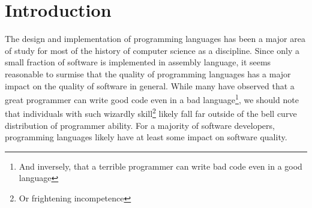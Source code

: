 %
%

\chapter{Introduction}\label{ch:intro} %

The design and implementation of programming languages has been a major area of study for most of the history of computer science as a discipline. Since only a small fraction of software is implemented in assembly language, it seems reasonable to surmise that the quality of programming languages has a major impact on the quality of software in general. While many have observed that a great programmer can write good code even in a bad language\footnote{And inversely, that a terrible programmer can write bad code even in a good language}, we should note that individuals with such wizardly skill\footnote{Or frightening incompetence} likely fall far outside of the bell curve distribution of programmer ability. For a majority of software developers, programming languages likely have at least some impact on software quality.
%
%
